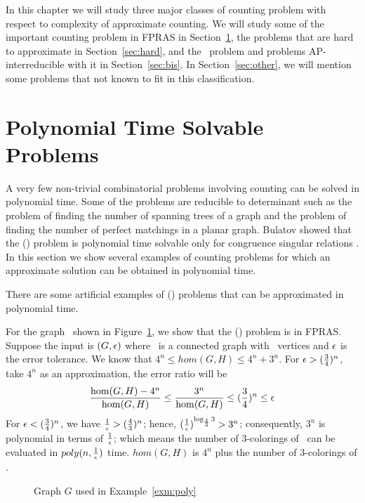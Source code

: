 In this chapter we will study three major classes of counting problem with respect
to complexity of approximate counting. We will study some of the important counting problem in FPRAS
in Section~\ref{sec:poly}, the problems that are hard to approximate in Section~\ref{sec:hard}, 
and the \cbis\ problem and problems AP-interreducible with it in Section~\ref{sec:bis}\@.
In Section~\ref{sec:other}, we will mention some problems that not known to fit in this classification.

\section{Polynomial Time Solvable Problems} \label{sec:poly}
A very few non-trivial combinatorial problems involving counting 
can be solved in polynomial time.
Some of the problems are reducible to determinant such as
the problem of finding the number of spanning trees of a graph and 
the problem of finding the number of perfect matchings in a planar graph.
Bulatov \cite{Bulatov} showed that the \ccsp(\mrelset) problem is polynomial time solvable
only for congruence singular relations \mrelset\@.
In this section we show several
examples of counting problems for which an approximate solution can be obtained in polynomial time.

There are some artificial examples of \ccsp(\mrelset) problems that can be approximated 
in polynomial time. 

\begin{example} \label{exp:poly}
For the graph \mH\ shown in Figure~\ref{fig:approxible},
we show that the \chom(\mH) problem is in FPRAS\@. Suppose the input is 
\((G,\epsilon)\) where \mG\ is a connected graph with \mn\ vertices and \(\epsilon\)
is the error tolerance.
We know that 
\(4^n\le hom(G,H) \le 4^n+3^n\)\@.
For \(\epsilon > (\frac{3}{4})^n\), take \(4^n\) as an approximation, the error ratio will  be
\[\frac{\hom(G,H)-4^n}{\hom(G,H)} \le \frac{3^n}{\hom(G,H)} \le (\frac{3}{4})^n \le \epsilon\]
For \(\epsilon < (\frac{3}{4})^n\), we have \(\frac{1}{\epsilon}>(\frac{4}{3})^n \);
hence, \((\frac{1}{\epsilon})^{\log_{\frac{4}{3}}3} > 3^n\); consequently, \(3^n\) is polynomial 
in terms of \(\frac{1}{\epsilon}\); which means the number of 3-colorings of \mG\ can be evaluated in 
\(poly(n,\frac{1}{\epsilon})\) time. 
\(hom(G,H)\) is \(4^n\) plus the number of 3-colorings of \mG\@.

\begin{figure}[h]
\center
\caption{Graph \ensuremath{G} used in Example~\ref{exm:poly}}
\label{fig:approxible}
\end{figure}
\end{example}

